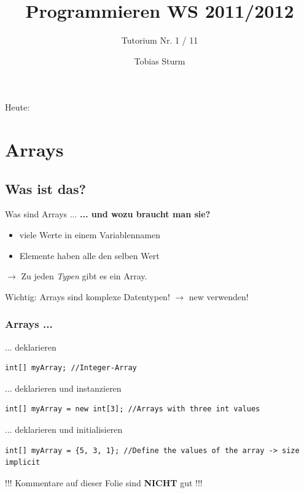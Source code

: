 \documentclass[18pt]{beamer}
\title[Proggen WS11/12]{Programmieren WS 2011/2012}
\subtitle{Tutorium Nr. 1 / 11}
\author{Tobias Sturm} %
\institute{Zertifizierbare Vertrauenswürdige Informatiksysteme}
\date[23.1.12] %
\begin{document}


\begin{frame}
	\titlepage
\end{frame}


\begin{frame}{Heute:}
	\tableofcontents
\end{frame}


\section{Arrays}
\subsection{Was ist das?}
\begin{frame}{Was sind Arrays ...}
	\textbf{... und wozu braucht man sie?} \pause
		\begin{itemize}
			\item viele Werte in einem Variablennamen
			\item Elemente haben alle den selben Wert
		\end{itemize}
		
		$\rightarrow$ Zu jeden \emph{Typen} gibt es ein Array.\pause
		
		Wichtig: Arrays sind komplexe Datentypen! $\rightarrow$ new verwenden!
\end{frame}


\begin{frame}[containsverbatim]
	\frametitle{Arrays ...}
		
		... deklarieren
		\begin{lstlisting}
int[] myArray; //Integer-Array
		\end{lstlisting}

		... deklarieren und instanzieren
		\begin{lstlisting}
int[] myArray = new int[3]; //Arrays with three int values
		\end{lstlisting}
		
		... deklarieren und initialisieren
		\begin{lstlisting}
int[] myArray = {5, 3, 1}; //Define the values of the array -> size implicit
		\end{lstlisting}

		\pause !!! Kommentare auf dieser Folie sind \textbf{NICHT} gut !!!
\end{frame}
\end{document}
